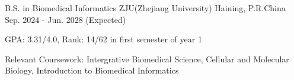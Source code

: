 

\begin{cventries}

  \cventry
    {B.S. in Biomedical Informatics} %
    {ZJU(Zhejiang University)} %
    {Haining, P.R.China} %
    {Sep. 2024 - Jun. 2028 (Expected)} %
    {
      \begin{cvitems} %
        \item {GPA: 3.31/4.0, Rank: 14/62 in first semester of year 1}
        \item {Relevant Coursework: Intergrative Biomedical Science, Cellular and Molecular Biology, Introduction to Biomedical Informatics}
      \end{cvitems}
    }

\end{cventries}
